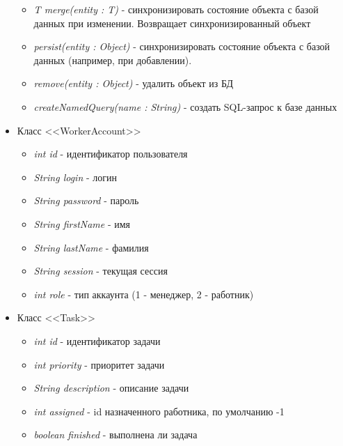 \begin{itemize}
\begin{itemize}
			\item \textit{T merge(entity : T)} - синхронизировать состояние объекта с базой данных при изменении. Возвращает синхронизированный объект
			
			\item \textit{persist(entity : Object)} - синхронизировать состояние объекта с базой данных (например, при добавлении).
			
			\item \textit{remove(entity : Object)} - удалить объект из БД
			
			\item \textit{createNamedQuery(name : String)} - создать SQL-запрос к базе данных		
		\end{itemize}		
		
		\item Класс <<WorkerAccount>>
		\begin{itemize}
			
			\item \textit{int id} - идентификатор пользователя
			\item \textit{String login} - логин
			\item \textit{String password} - пароль
			\item \textit{String firstName} - имя
			\item \textit{String lastName} - фамилия
			\item \textit{String session} - текущая сессия
			\item \textit{int role} - тип аккаунта (1 - менеджер, 2 - работник)	
		\end{itemize}	
		
		\item Класс <<Task>>
		\begin{itemize}
			
			\item \textit{int id} - идентификатор задачи
			\item \textit{int priority} - приоритет задачи
			\item \textit{String description} - описание задачи
			\item \textit{int assigned} - id назначенного работника, по умолчанию -1
			\item \textit{boolean finished} - выполнена ли задача
		\end{itemize}
\end{itemize}	